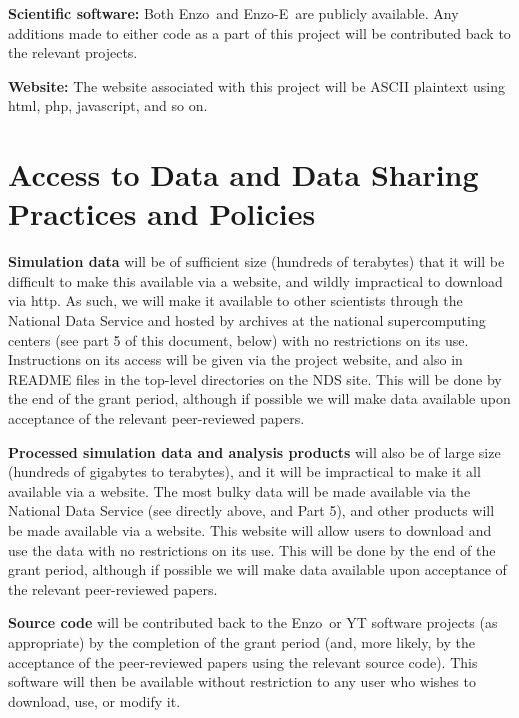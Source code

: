\documentclass[11pt]{article}
\def\enzo{Enzo}
\def\enzoe{Enzo-E}
\begin{document}
\vspace{2mm}
\noindent \textbf{Scientific software:} Both \enzo\ and \enzoe\ are
publicly available.
Any additions made to either code as a part of this
project will be contributed back to the relevant projects.

\vspace{2mm}
\noindent \textbf{Website:} The website associated with this project
will be ASCII plaintext using html, php, javascript, and so on.

\vspace{-3mm}
\section{Access to Data and Data Sharing Practices and Policies}
\vspace{-3mm}

\noindent\textbf{Simulation data} will be of sufficient size (hundreds
of terabytes) that it will be difficult to make
this available via a website, and wildly impractical to download via
http.  As such, we will make it available to other scientists through
the National Data Service  and hosted by archives at
the national supercomputing centers (see part 5 of this document,
below) with no restrictions on its use.  Instructions on its access
will be given via the project website, and also in README files in the
top-level directories on the NDS site.  This will be done by the end
of the grant period, although if possible we will make data available
upon acceptance of the relevant peer-reviewed papers.

\noindent\textbf{Processed simulation data and analysis products} will
also be of large size (hundreds of gigabytes to terabytes), and it
will be impractical to make it all available via a website.  The most
bulky data will be made available via the National Data Service (see
directly above, and Part 5), and other products  will be made
available via a website.  This website will allow users to
download and use the data with no restrictions on its use.  This will
be done by the end of the grant period, although if possible we will
make data available upon acceptance of the relevant peer-reviewed
papers.

\noindent\textbf{Source code} will be contributed back to the \enzo\  or YT software
projects (as appropriate) by the completion of the grant period (and,
more likely, by the acceptance of the peer-reviewed papers using the
relevant source code).  This software will then be available without
restriction to any user who wishes to download, use, or modify it.
\end{document}
